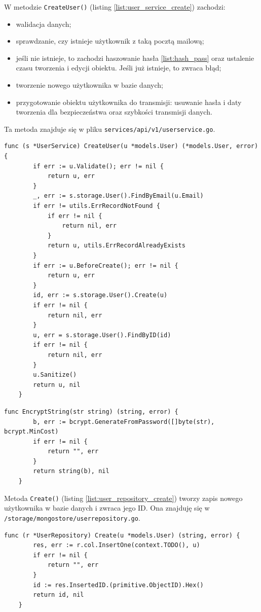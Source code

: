 W metodzie \texttt{CreateUser()} (listing \ref{list:user_service_create}) zachodzi:
\begin{itemize}
    \item walidacja danych;
    \item sprawdzanie, czy istnieje użytkownik z taką pocztą mailową;
    \item jeśli nie istnieje, to zachodzi haszowanie hasła \ref{list:hash_pass} oraz ustalenie czasu tworzenia i edycji obiektu. Jeśli już istnieje, to zwraca błąd;
    \item tworzenie nowego użytkownika w bazie danych;
    \item przygotowanie obiektu użytkownika do transmisji: usuwanie hasła i daty tworzenia dla bezpieczeństwa oraz szybkości transmisji danych.
\end{itemize}
Ta metoda znajduje się w pliku \texttt{services/api/v1/userservice.go}.
\begin{lstlisting}[label=list:user_service_create,caption=Serwis tworzenia użytkownika,basicstyle=\tiny\ttfamily]
    func (s *UserService) CreateUser(u *models.User) (*models.User, error) {
        if err := u.Validate(); err != nil {
            return u, err
        }
        _, err := s.storage.User().FindByEmail(u.Email)
        if err != utils.ErrRecordNotFound {
            if err != nil {
                return nil, err
            }
            return u, utils.ErrRecordAlreadyExists
        }
        if err := u.BeforeCreate(); err != nil {
            return u, err
        }
        id, err := s.storage.User().Create(u)
        if err != nil {
            return nil, err
        }
        u, err = s.storage.User().FindByID(id)
        if err != nil {
            return nil, err
        }
        u.Sanitize()
        return u, nil
    }
\end{lstlisting}
\begin{lstlisting}[label=list:hash_pass,caption=Haszowanie hasła,basicstyle=\tiny\ttfamily]
    func EncryptString(str string) (string, error) {
        b, err := bcrypt.GenerateFromPassword([]byte(str), bcrypt.MinCost)
        if err != nil {
            return "", err
        }
        return string(b), nil
    }
\end{lstlisting}

Metoda \texttt{Create()} (listing \ref{list:user_repository_create}) tworzy zapis nowego użytkownika w bazie danych i zwraca jego ID.
Ona znajduję się w \texttt{/storage/mongostore/userrepository.go}.
\begin{lstlisting}[label=list:user_repository_create,caption=Zachowanie użytkownika do bazy danych,basicstyle=\tiny\ttfamily]
    func (r *UserRepository) Create(u *models.User) (string, error) {
        res, err := r.col.InsertOne(context.TODO(), u)
        if err != nil {
            return "", err
        }
        id := res.InsertedID.(primitive.ObjectID).Hex()
        return id, nil
    }
\end{lstlisting}

